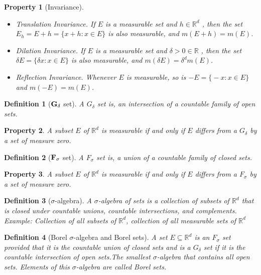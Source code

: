 \documentclass{report}
\theoremstyle{upthm}
\newtheorem{defn}{Definition}
\newtheorem{property}{Property}
\newcommand{\reals}{\mathbb{R}}
\newcommand{\set}[1]{\big\lbrace #1 \big\rbrace}
\begin{document}
\begin{property}[Invariance]
	\item
	\begin{itemize}
		\item Translation Invariance. If $E$ is a measurable set and $h \in \reals^d$ , then the set $E_h = E + h = \set{x + h : x \in E}$ is also measurable, and $m(E + h) = m(E)$.
		\item Dilation Invariance. If $E$ is a measurable set and $\delta > 0 \in \reals$ , then the set $\delta E = \set{\delta x : x \in E}$ is also measurable, and $m(\delta E) = \delta^d m(E)$.
		\item Reflection Invariance. Whenever $E$ is measurable, so is $ -E = \set{-x : x \in E}$ and $m(-E) = m(E)$.
	\end{itemize}
\end{property}

\begin{defn}[$\bf G_\delta$ set]
	A $G_\delta$ set is, an intersection of a countable family of open sets.
\end{defn}

\begin{property}
	A subset $E$ of $\reals^d$ is measurable if and only if $E$ differs from a $G_\delta$ by a set of measure zero.
\end{property}

\begin{defn}[$\bf F_\sigma$ set]
	A $F_\sigma$ set is, a union of a countable family of closed sets.
\end{defn}


\begin{property}
	A subset $E$ of $\reals^d$ is measurable if and only if $E$ differs from a $F_\sigma$ by a set of measure zero.
\end{property}

\begin{defn}[$\sigma$-algebra]
	A $\sigma$-algebra of sets is a collection of subsets of $\reals^d$ that is closed under countable unions, countable intersections, and complements. Example: Collection of all subsets of $\reals^d$, collection of all measurable sets of $\reals^d$
\end{defn}
\begin{defn}[Borel $\sigma$-algebra and Borel sets]
	A set $E \subseteq \reals^d $ is an $F_\sigma$ set provided that it is the countable union of closed	sets and is a $G_\delta$ set if it is the countable intersection of open sets.The smallest $\sigma$-algebra that contains all open sets. Elements of this $\sigma$-algebra are called	Borel sets.
\end{defn}
\end{document}
